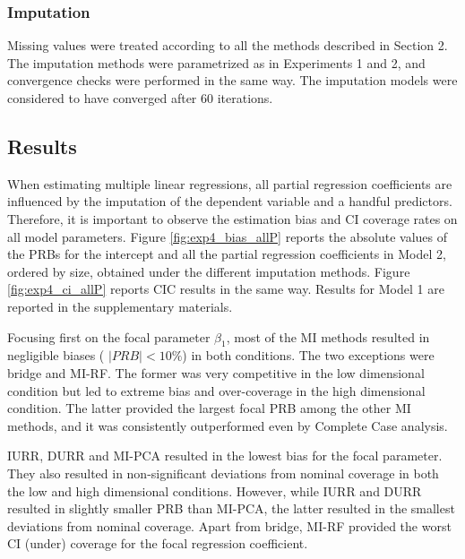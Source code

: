 \subsubsection{Imputation}
	
	Missing values were treated according to all the methods described in Section 2.
	The imputation methods were parametrized as in Experiments 1 and 2, and
	convergence checks were performed in the same way.
	The imputation models were considered to have converged after 60 iterations.

\subsection{Results}

	When estimating multiple linear regressions, all partial regression coefficients are influenced by the 
	imputation of the dependent variable and a handful predictors.
	Therefore, it is important to observe the estimation bias and CI coverage rates on all model parameters.
	Figure \ref{fig:exp4_bias_allP} reports the absolute values of the PRBs for the intercept and all the partial regression
	coefficients in Model 2, ordered by size, obtained under the different imputation methods.
	Figure \ref{fig:exp4_ci_allP} reports CIC results in the same way.
	Results for Model 1 are reported in the supplementary materials.

	Focusing first on the focal parameter $\beta_1$, most of the MI methods resulted in negligible biases ( $| PRB | < 10\%$) 
	in both conditions.
	The two exceptions were bridge and MI-RF. 
	The former was very competitive in the low dimensional condition but led to extreme bias and over-coverage in the 
	high dimensional condition.
	The latter provided the largest focal PRB among the other MI methods, and it was consistently outperformed even 
	by Complete Case analysis.

	IURR, DURR and MI-PCA resulted in the lowest bias for the focal parameter.
	They also resulted in non-significant deviations from nominal coverage in both the low and high
	dimensional conditions.
	However, while IURR and DURR resulted in slightly smaller PRB than MI-PCA, the latter resulted in the smallest 
	deviations from nominal coverage.
	Apart from bridge, MI-RF provided the worst CI (under) coverage for the focal regression coefficient.

